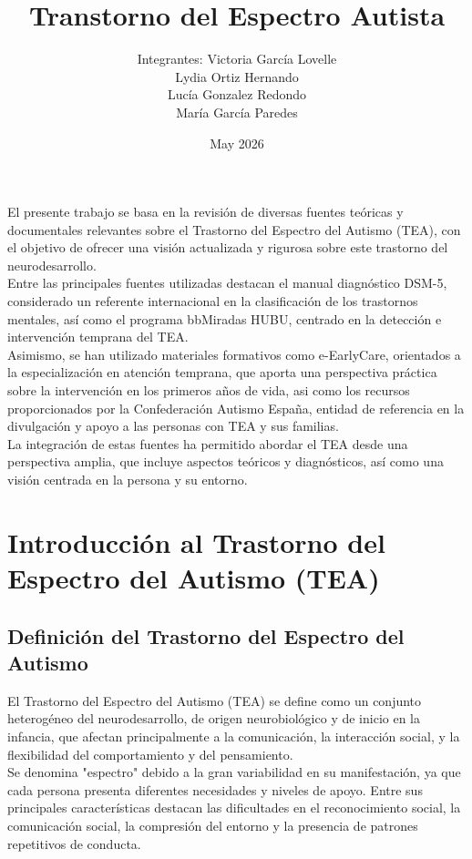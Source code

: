 \documentclass{article}
\title{\textbf{Transtorno del Espectro Autista}}
\author{Integrantes: Victoria García Lovelle\\
Lydia Ortiz Hernando\\
Lucía Gonzalez Redondo\\ 
María García Paredes}
\date{May 2026}
\begin{document}
\maketitle
\newpage
\tableofcontents
\listoffigures


\newpage
El presente trabajo se basa en la revisión de diversas fuentes teóricas y documentales relevantes sobre el Trastorno del Espectro del Autismo (TEA), con el objetivo de ofrecer una visión actualizada y rigurosa sobre este trastorno del neurodesarrollo.\\

Entre las principales fuentes utilizadas destacan el manual diagnóstico DSM-5, considerado un referente internacional en la clasificación de los trastornos mentales, así como el programa bbMiradas HUBU, centrado en la detección e intervención temprana del TEA.\\

Asimismo, se han utilizado materiales formativos como e-EarlyCare, orientados a la especialización en atención temprana, que aporta una perspectiva práctica sobre la intervención en los primeros años de vida, asi como los recursos proporcionados por la Confederación Autismo España, entidad de referencia en la divulgación y apoyo a las personas con TEA y sus familias.\\

La integración de estas fuentes ha permitido abordar el TEA desde una perspectiva amplia, que incluye aspectos teóricos y diagnósticos, así como una visión centrada en la persona y su entorno.\\


\section{\textbf{Introducción al Trastorno del Espectro del Autismo (TEA)}}
\subsection{\textbf{Definición del Trastorno del Espectro del Autismo}}
El Trastorno del Espectro del Autismo (TEA) se define como un conjunto heterogéneo del neurodesarrollo, de origen neurobiológico y de inicio en la infancia, que afectan principalmente a la comunicación, la interacción social, y la flexibilidad del comportamiento y del pensamiento.\\

Se denomina "espectro" debido a la gran variabilidad en su manifestación, ya que cada persona presenta diferentes necesidades y niveles de apoyo. Entre sus principales características destacan las dificultades en el reconocimiento social, la comunicación social, la compresión del entorno y la presencia de patrones repetitivos de conducta.\\
\end{document}

